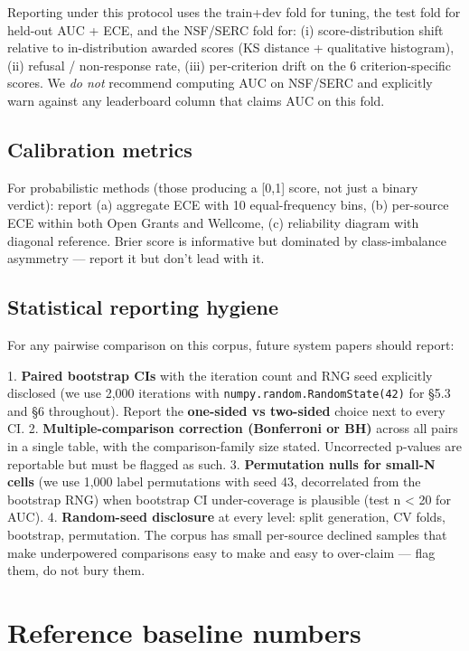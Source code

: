 \documentclass[11pt]{article}
\begin{document}
Reporting under this protocol uses the train+dev fold for tuning, the test fold for held-out AUC + ECE, and the NSF/SERC fold for: (i) score-distribution shift relative to in-distribution awarded scores (KS distance + qualitative histogram), (ii) refusal / non-response rate, (iii) per-criterion drift on the 6 criterion-specific scores. We \emph{do not} recommend computing AUC on NSF/SERC and explicitly warn against any leaderboard column that claims AUC on this fold.

\subsection{Calibration metrics}

For probabilistic methods (those producing a [0,1] score, not just a binary verdict): report (a) aggregate ECE with 10 equal-frequency bins, (b) per-source ECE within both Open Grants and Wellcome, (c) reliability diagram with diagonal reference. Brier score is informative but dominated by class-imbalance asymmetry --- report it but don't lead with it.

\subsection{Statistical reporting hygiene}

For any pairwise comparison on this corpus, future system papers should report:

1. \textbf{Paired bootstrap CIs} with the iteration count and RNG seed explicitly disclosed (we use 2,000 iterations with \texttt{numpy.random.RandomState(42)} for §5.3 and §6 throughout). Report the \textbf{one-sided vs two-sided} choice next to every CI.
2. \textbf{Multiple-comparison correction (Bonferroni or BH)} across all pairs in a single table, with the comparison-family size stated. Uncorrected p-values are reportable but must be flagged as such.
3. \textbf{Permutation nulls for small-N cells} (we use 1,000 label permutations with seed 43, decorrelated from the bootstrap RNG) when bootstrap CI under-coverage is plausible (test n < 20 for AUC).
4. \textbf{Random-seed disclosure} at every level: split generation, CV folds, bootstrap, permutation. The corpus has small per-source declined samples that make underpowered comparisons easy to make and easy to over-claim --- flag them, do not bury them.

\section{Reference baseline numbers}
\end{document}
